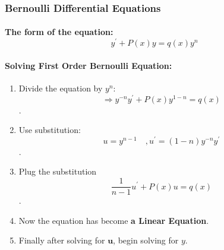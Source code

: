 \documentclass{article}
\begin{document}
\subsubsection{Bernoulli Differential Equations}
\paragraph{The form of the equation:
	\[y^{'}+P(x)y=q(x)y^{n}\]
}
\paragraph{Solving First Order Bernoulli Equation:}
\begin{enumerate}
	\item Divide the equation by $y^{n}$:
	\[\Rightarrow y^{-n}y^{'}+P(x)y^{1-n}=q(x)\].\\ \vspace{2em}
	\item Use substitution:
	\[u=y^{n-1}\quad,u^{'}=(1-n)y^{-n}y^{'}\].\\ \vspace{2em}
	\item Plug the substitution
	\[\frac{1}{n-1}u^{'}+P(x)u=q(x)\]. \\ \vspace{2em}
	\item Now the equation has become \textbf{a Linear Equation}.\\ \vspace{2em}
	\item Finally after solving for $\mathbf{u}$, begin solving for $y$.
\end{enumerate}
\end{document}
